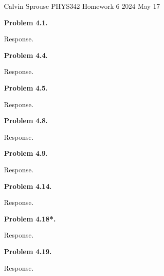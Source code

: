 \documentclass[a4paper, 12pt]{config/homework}
\begin{document}
\noindent
Calvin Sprouse \hfill PHYS342 Homework 6 \hfill 2024 May 17

\bigskip
\noindent
\textbf{Problem 4.1.}

\noindent
Response.

\pagebreak
\noindent
\textbf{Problem 4.4.}

\noindent
Response.

\pagebreak
\noindent
\textbf{Problem 4.5.}

\noindent
Response.

\pagebreak
\noindent
\textbf{Problem 4.8.}

\noindent
Response.

\pagebreak
\noindent
\textbf{Problem 4.9.}

\noindent
Response.

\pagebreak
\noindent
\textbf{Problem 4.14.}

\noindent
Response.

\pagebreak
\noindent
\textbf{Problem 4.18*.}

\noindent
Response.

\pagebreak
\noindent
\textbf{Problem 4.19.}

\noindent
Response.
\end{document}
